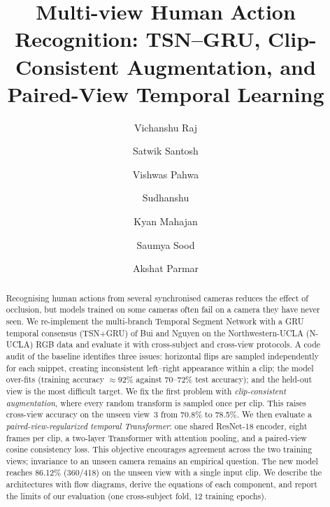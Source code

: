 \documentclass[runningheads]{llncs}
\begin{document}
\title{Multi-view Human Action Recognition: TSN--GRU, Clip-Consistent Augmentation, and Paired-View Temporal Learning}

\author{Vichanshu Raj \and Satwik Santosh \and Vishwas Pahwa \and Sudhanshu \and Kyan Mahajan \and Saumya Sood \and Akshat Parmar}


\maketitle

\begin{abstract}
Recognising human actions from several synchronised cameras reduces the effect of occlusion, but models trained on some cameras often fail on a camera they have never seen.
We re-implement the multi-branch Temporal Segment Network with a GRU temporal consensus (TSN+GRU) of Bui and Nguyen on the Northwestern-UCLA (N-UCLA) RGB data and evaluate it with cross-subject and cross-view protocols.
A code audit of the baseline identifies three issues: horizontal flips are sampled independently for each snippet, creating inconsistent left--right appearance within a clip; the model over-fits (training accuracy $\approx$92\% against 70--72\% test accuracy); and the held-out view is the most difficult target.
We fix the first problem with \emph{clip-consistent augmentation}, where every random transform is sampled once per clip. This raises cross-view accuracy on the unseen view~3 from 70.8\% to 78.5\%.
We then evaluate a \emph{paired-view-regularized temporal Transformer}: one shared ResNet-18 encoder, eight frames per clip, a two-layer Transformer with attention pooling, and a paired-view cosine consistency loss. This objective encourages agreement across the two training views; invariance to an unseen camera remains an empirical question.
The new model reaches 86.12\% (360/418) on the unseen view with a single input clip.
We describe the architectures with flow diagrams, derive the equations of each component, and report the limits of our evaluation (one cross-subject fold, 12 training epochs).

\end{abstract}
\end{document}
